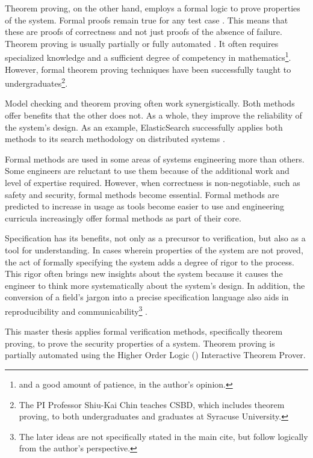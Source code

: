\documentclass[../../main/main.tex]{subfiles}
\begin{document}
Theorem proving, on the other hand, employs a formal logic to prove properties of the system.  Formal proofs remain true for any test case \cite{formalCarnegie}.  This means that these are proofs of correctness and not just proofs of the absence of failure.  Theorem proving is usually partially or fully automated \cite{wikiformalmethods}.  It often requires specialized knowledge and a sufficient degree of competency in mathematics\footnote{and a good amount of patience, in the author's opinion.}. However, formal theorem proving techniques have been successfully taught to undergraduates\footnote{The PI Professor Shiu-Kai Chin teaches CSBD, which includes theorem proving, to both undergraduates and graduates at Syracuse University.}.  


Model checking and theorem proving often work synergistically.  Both methods offer benefits that the other does not.  As a whole, they improve the reliability of the system's design.   As an example, ElasticSearch successfully applies both methods to its search methodology on distributed systems \cite{elasticsearch}.  

Formal methods are used in some areas of systems engineering more than others.  Some engineers are reluctant to use them because of the additional work and level of expertise required.  However, when correctness is non-negotiable, such as safety and security, formal methods become essential.  Formal methods are predicted to increase in usage as tools become easier to use and engineering curricula increasingly offer formal methods as part of their core\cite{formalCarnegie}.

Specification has its benefits, not only as a precursor to verification, but also as a tool for understanding.  In cases wherein properties of the system are not proved, the act of formally specifying the system adds a degree of rigor to the process. This rigor often brings new insights about the system because it causes the engineer to think more systematically about the system's design.  In addition, the conversion of a field's jargon into a precise specification language also aids in reproducibility and communicability\footnote{The later ideas are not specifically stated in the main cite, but follow logically from the author's perspective.} \cite{formalCarnegie}.  

This master thesis applies formal verification methods, specifically theorem proving, to prove the security properties of a system.  Theorem proving is partially automated using the Higher Order Logic () Interactive Theorem Prover. 
\end{document}
